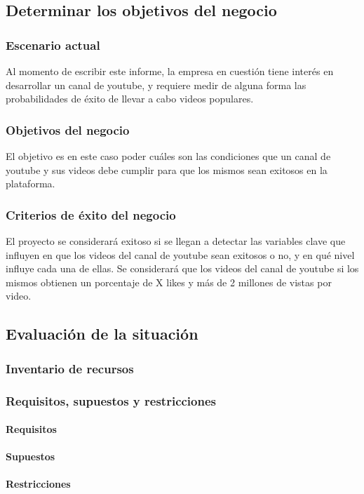 \subsection{Determinar los objetivos del negocio}
    \subsubsection{Escenario actual}
    Al momento de escribir este informe, la empresa en cuestión tiene interés
    en desarrollar un canal de youtube, y requiere medir de alguna forma las
    probabilidades de éxito de llevar a cabo videos populares.
    \subsubsection{Objetivos del negocio}
    El objetivo es en este caso poder  cuáles son las condiciones que un canal
    de youtube y sus videos debe cumplir para que los mismos sean exitosos en
    la plataforma.
    \subsubsection{Criterios de éxito del negocio}
    El proyecto se considerará exitoso si se llegan a detectar las variables
    clave que influyen en que los videos del canal de youtube sean exitosos o
    no, y en qué nivel influye cada una de ellas. Se considerará que los videos
    del canal de youtube si los mismos obtienen un porcentaje de X likes y más
    de 2 millones de vistas por video.
\subsection{Evaluación de la situación}
    \subsubsection{Inventario de recursos}
    \subsubsection{Requisitos, supuestos y restricciones}
        \paragraph{Requisitos}
        \paragraph{Supuestos}
        \paragraph{Restricciones}
